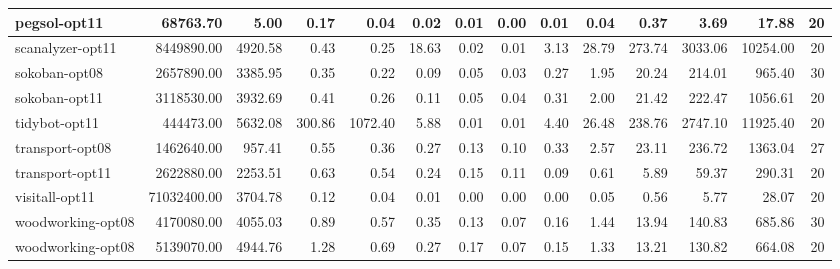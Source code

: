 \documentclass[a4paper,12pt]{article}
\begin{document}
\begin{table}[]
\begin{tabular}{l@{\hspace{6pt}} *{13}{|r}}
pegsol-opt11 & 68763.70& 5.00& 0.17& 0.04& 0.02& 0.01& 0.00& 0.01& 0.04& 0.37& 3.69& 17.88& 20\\ \hline
scanalyzer-opt11 & 8449890.00& 4920.58& 0.43& 0.25& 18.63& 0.02& 0.01& 3.13& 28.79& 273.74& 3033.06& 10254.00& 20\\ \hline
sokoban-opt08 & 2657890.00& 3385.95& 0.35& 0.22& 0.09& 0.05& 0.03& 0.27& 1.95& 20.24& 214.01& 965.40& 30\\ \hline
sokoban-opt11 & 3118530.00& 3932.69& 0.41& 0.26& 0.11& 0.05& 0.04& 0.31& 2.00& 21.42& 222.47& 1056.61& 20\\ \hline
tidybot-opt11 & 444473.00& 5632.08& 300.86& 1072.40& 5.88& 0.01& 0.01& 4.40& 26.48& 238.76& 2747.10& 11925.40& 20\\ \hline
transport-opt08 & 1462640.00& 957.41& 0.55& 0.36& 0.27& 0.13& 0.10& 0.33& 2.57& 23.11& 236.72& 1363.04& 27\\ \hline
transport-opt11 & 2622880.00& 2253.51& 0.63& 0.54& 0.24& 0.15& 0.11& 0.09& 0.61& 5.89& 59.37& 290.31& 20\\ \hline
visitall-opt11 & 71032400.00& 3704.78& 0.12& 0.04& 0.01& 0.00& 0.00& 0.00& 0.05& 0.56& 5.77& 28.07& 20\\ \hline
woodworking-opt08 & 4170080.00& 4055.03& 0.89& 0.57& 0.35& 0.13& 0.07& 0.16& 1.44& 13.94& 140.83& 685.86& 30\\ \hline
woodworking-opt08 & 5139070.00& 4944.76& 1.28& 0.69& 0.27& 0.17& 0.07& 0.15& 1.33& 13.21& 130.82& 664.08& 20\\ \hline
\end{tabular}
\end{table}
\end{document}
